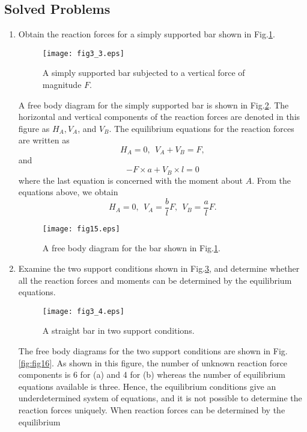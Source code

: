 ﻿\documentclass[10pt,a4j]{article}
\begin{document}
\subsection{Solved Problems}
\begin{enumerate}
\item
Obtain the reaction forces for a simply supported bar shown in Fig.\ref{fig:fig3_3}. 
\begin{figure}[h]
	\begin{center}
	\texttt{[image: fig3\_3.eps]} 
	\end{center}
	\caption{A simply supported bar subjected to a vertical force of magnitude $F$.}
	\label{fig:fig3_3}
\end{figure}
{\small
	A free body diagram for the simply supported bar is shown in Fig.\ref{fig:fig15}. 
	The horizontal and vertical components of the reaction forces are denoted in
	this figure as $H_A, V_A$, and $V_B$.
	The equilibrium equations for the reaction forces are written as 
	\[
		H_A=0, \ \ V_A+V_B=F, 
	\]
	and 
	\[
		-F\times a +V_B\times l =0
	\]
	where the last equation is concerned with the moment about $A$.
	From the equations above, we obtain
	\[
		H_A=0, \ \ V_A=\frac{b}{l}F, \ \ V_B=\frac{a}{l}F.
	\]
}
	\begin{figure}[h]
	\begin{center}
	\texttt{[image: fig15.eps]} 
	\end{center}
	\caption{A free body diagram for the bar shown in Fig.\ref{fig:fig3_3}.} 
	\label{fig:fig15}
	\end{figure}
\item
Examine the two support conditions shown in Fig.\ref{fig:fig3_4}, 
and determine whether all the reaction forces and moments can 
be determined by the equilibrium equations. 
\begin{figure}[h]
	\begin{center}
	\texttt{[image: fig3\_4.eps]} 
	\end{center}
	\caption{A straight bar in two support conditions.} 
	\label{fig:fig3_4}
\end{figure}
{\small
	The free body diagrams for the two support conditions are shown in Fig.\ref{fig:fig16}. 
	As shown in this figure, the number of unknown reaction force components is  
	6 for (a) and 4 for (b) whereas the number of equilibrium equations 
	available is three. Hence, the equilibrium conditions give an underdetermined 
	system of equations, and it is not possible to determine the 
	reaction forces uniquely. When reaction forces can be determined by the equilibrium 
}
\end{enumerate}
\end{document}
